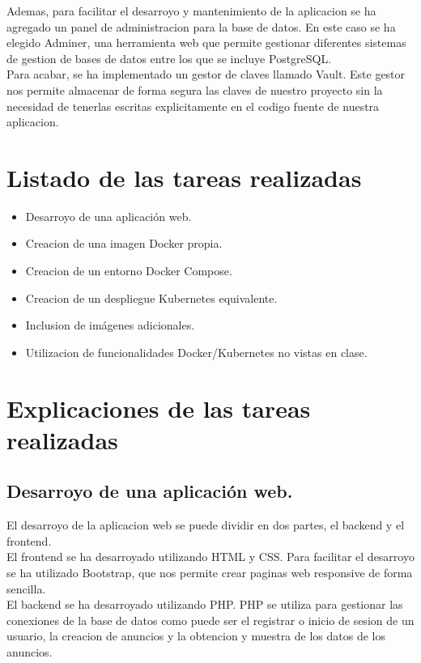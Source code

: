 \documentclass{report}
\begin{document}
        Ademas, para facilitar el desarroyo y mantenimiento de la aplicacion se ha agregado un panel de administracion para la base de datos.
        En este caso se ha elegido Adminer, una herramienta web que permite gestionar diferentes sistemas de gestion de bases de datos entre los que se incluye PostgreSQL.\\

        Para acabar, se ha implementado un gestor de claves llamado Vault. Este gestor nos permite almacenar de forma segura las claves de nuestro proyecto sin la necesidad de tenerlas escritas explicitamente en el codigo fuente de nuestra aplicacion.
    \chapter{Listado de las tareas realizadas}
        \begin{itemize}
            \item Desarroyo de una aplicación web.
            \item Creacion de una imagen Docker propia.
            \item Creacion de un entorno Docker Compose.
            \item Creacion de un despliegue Kubernetes equivalente.
            \item Inclusion de imágenes adicionales.
            \item Utilizacion de funcionalidades Docker/Kubernetes no vistas en clase.
        \end{itemize}
    \chapter{Explicaciones de las tareas realizadas}
        \section{Desarroyo de una aplicación web.}
            El desarroyo de la aplicacion web se puede dividir en dos partes, el backend y el frontend.\\

            El frontend se ha desarroyado utilizando HTML y CSS.
            Para facilitar el desarroyo se ha utilizado Bootstrap, que nos permite crear paginas web responsive de forma sencilla.\\

            El backend se ha desarroyado utilizando PHP.
            PHP se utiliza para gestionar las conexiones de la base de datos como puede ser el registrar o inicio de sesion de un usuario, la creacion de anuncios y la obtencion y muestra de los datos de los anuncios.\\
\end{document}
